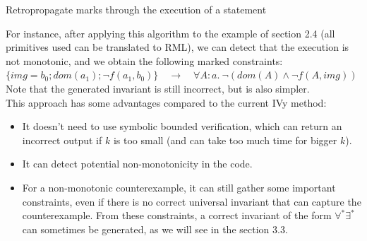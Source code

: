 \documentclass[11pt,a4paper,oldfontcommands,openany]{memoir}
\begin{document}
    \begin{algorithm}[H]
        \caption{Retropropagate marks through the execution of a statement}
    \end{algorithm}\hfill

    For instance, after applying this algorithm to the example of section 2.4 (all primitives used can be translated to RML),
    we can detect that the execution is not monotonic, and we obtain the following marked constraints:\\
    \(\{img=b_0 ; dom(a_1) ; \neg f(a_1,b_0)\} \quad \longrightarrow \quad \forall A:a.\ \neg (dom(A) \land \neg f(A,img))\)\\
    Note that the generated invariant is still incorrect, but is also simpler.\\

    This approach has some advantages compared to the current IVy method:
    \begin{itemize}
        \item It doesn't need to use symbolic bounded verification, which can return an incorrect output if \(k\) is too small (and can take too much time for bigger \(k\)).
        \item It can detect potential non-monotonicity in the code.
        \item For a non-monotonic counterexample, it can still gather some important constraints, even if there is no correct universal invariant that can capture the counterexample.
        From these constraints, a correct invariant of the form \(\forall^*\exists^*\) can sometimes be generated, as we will see in the section 3.3.
    \end{itemize}
\end{document}
